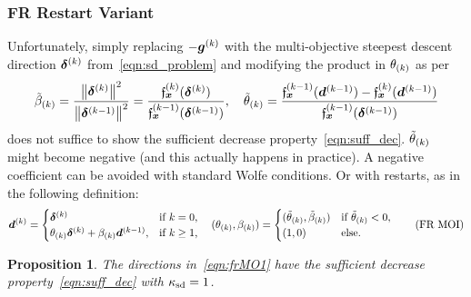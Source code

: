 \documentclass{article}
\theoremstyle{plain}
\newtheorem{proposition}[theorem]{Proposition}
\theoremstyle{definition}
\begin{document}
\subsubsection*{FR Restart Variant}
Unfortunately, simply replacing $-\bm{g}^{(k)}$ 
with the multi-objective steepest descent direction
$\bm{\delta}^{(k)}$ from~\eqref{eqn:sd_problem} and modifying 
the product in $\theta_{(k)}$ as per
\begin{equation}
	\tilde{\beta}_{(k)} 
	= 
	\frac{
		\left\|\bm{\delta}^{(k)}\right\|^2
	}{
		\left\|\bm{\delta}^{(k-1)}\right\|^2
	}
	=
	\frac{\mathfrak{f}_{\bm{x}}^{(k)}(\bm{\delta}^{(k)})}{\mathfrak{f}_{\bm{x}}^{(k-1)}(\bm{\delta}^{(k-1)})},
	\quad
	\tilde{\theta}_{(k)}
	=
	\frac{
		\mathfrak{f}_{\bm{x}}^{(k-1)}(\bm{d}^{(k-1)})
		-
		\mathfrak{f}_{\bm{x}}^{(k)}(\bm{d}^{(k-1)})
	}{
		\mathfrak{f}_{\bm{x}}^{(k-1)}(\bm{\delta}^{(k-1)})
	}
	\label{eqn:hyposulphurousTontiners}
\end{equation}
does not suffice to show the sufficient decrease property~\eqref{eqn:suff_dec}.
$\tilde{\theta}_{(k)}$ might become negative (and this actually happens in practice).
A negative coefficient can be avoided with standard Wolfe conditions.
Or with restarts, as in the following definition:
\begin{equation}
	\bm{d}^{(k)}
	=
	\begin{cases}
		\bm{\delta}^{(k)}
		&\text{if $k = 0$},
		\\
		\theta_{(k)} \bm{\delta}^{(k)} + \beta_{(k)} \bm{d}^{(k-1)},
		&\text{if $k \geq 1$,}
	\end{cases}
	\quad
	(\theta_{(k)}, \beta_{(k)})
	= 
	\begin{cases}	
		(\tilde\theta_{(k)}, \tilde\beta_{(k)})
		&\text{if $\tilde\theta_{(k)} < 0$,}
		\\
		(1, 0)
		&\text{else.}
	\end{cases}
	\tag{FR~MOI}
	\label{eqn:frMO1}
\end{equation}

\begin{proposition}
	The directions in~\eqref{eqn:frMO1}
	have the sufficient decrease property~\eqref{eqn:suff_dec}
	with $\kappa_{\mathrm{sd}} = 1$.
\end{proposition}
\end{document}
